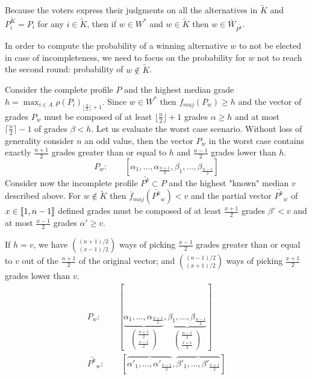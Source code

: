 \documentclass[version=3.21, pagesize, twoside=off, bibliography=totoc, DIV=calc, fontsize=12pt, a4paper]{scrartcl}
\begin{document}
Because the voters express their judgments on all the alternatives in $\tilde{K}$ and $P^{\tilde{K}}_{i} = P_i$ for any $i \in \tilde{K}$, then if $w \in W^*$ and $w \in \tilde{K}$ then $w \in \bar{W}_{\bar{P^k}}$.

In order to compute the probability of a winning alternative $w$ to not be elected in case of incompleteness, we need to focus on the probability for $w$ not to reach the second round: probability of $w \notin \tilde{K}$.

Consider the complete profile $P$ and the highest median grade $h=\max_{i\in A}\rho(P_i)_{\lfloor \frac{n}{2} \rfloor + 1}$. Since $w \in W^*$ then $f_{maj}(P_{w})\geq h$ and the vector of grades $P_w$ must be composed of at least $\lfloor \frac{n}{2}\rfloor+1$ grades $\alpha \geq h$ and at most $\lceil \frac{n}{2}\rceil-1$ of grades $\beta < h$. Let us evaluate the worst case scenario.
Without loss of generality consider $n$ an odd value, then the vector $P_{w}$ in the worst case contains exactly $\frac{n+1}{2}$ grades greater than or equal to $h$ and $\frac{n-1}{2}$ grades lower than $h$.
\[P_w : \qquad [ \alpha_1, \dots , \alpha_{\frac{n+1}{2}}, \beta_1, \dots , \beta_{\frac{n-1}{2}} ] \]
Consider now the incomplete profile $\bar{P^k} \subset P$ and the highest "known" median $v$ described above. For $w \notin \tilde{K}$ then $\bar{f}_{maj}(\bar{P^k}_w) < v$ and the partial vector $\bar{P^k}_w$ of $x\in \llbracket1,n-1\rrbracket$ defined grades must be composed of at least $\frac{x+1}{2}$ grades $\beta'<v$ and at most $\frac{x-1}{2}$ grades $\alpha' \geq v$. 

If $h=v$, we have $\binom{(n+1)/2}{(x-1)/2}$ ways of picking $\frac{x-1}{2}$ grades greater than or equal to $v$ out of the $\frac{n+1}{2}$ of the original vector; and $\binom{(n-1)/2}{(x+1)/2}$ ways of picking $\frac{x+1}{2}$ grades lower than $v$.
\begin{align}
	P_{w}: \qquad [ \underbrace{\alpha_1, \dots , \alpha_{\frac{n+1}{2}}}_{\begin{pmatrix}\frac{n+1}{2} \\ \frac{x-1}{2}\end{pmatrix}}, \underbrace{\beta_1, \dots , \beta_{\frac{n-1}{2}}}_{\begin{pmatrix}\frac{n-1}{2} \\ {\frac{x+1}{2}}\end{pmatrix}} ] \\
	\bar{P^k}_w:\qquad [ \overbrace{\alpha'_1, \dots , \alpha'_{\frac{x-1}{2}}}, \overbrace{\beta'_1, \dots , \beta'_{\frac{x+1}{2}}}]
\end{align} 
\newcommand{\largemath}[1]{{\mathlarger{\mathlarger{\mathlarger{\mathlarger{\mathlarger#1}}}}}}
\end{document}
